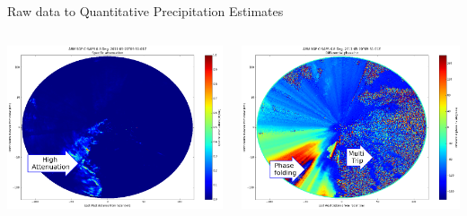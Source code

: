 \documentclass[final]{beamer}
\begin{document}
\begin{frame}{}
\begin{columns}[t]
\begin{column}{.3\linewidth}
\begin{block}{Raw data to Quantitative Precipitation Estimates}
\begin{columns}[t]
\begin{column}{.6\linewidth}
\begin{columns}[t]
\begin{column}{.5\linewidth}
			\includegraphics[width=1.0\linewidth]{figures/speca.png}\\[1ex]  
		\end{column}
		 \begin{column}{.5\linewidth}
                		\includegraphics[width=1.0\linewidth]{figures/phidp.png}\\[1ex] %

\end{column}
\end{columns}
\end{column}
\end{columns}
\end{block}
\end{column}
\end{columns}
\end{frame}
\end{document}
